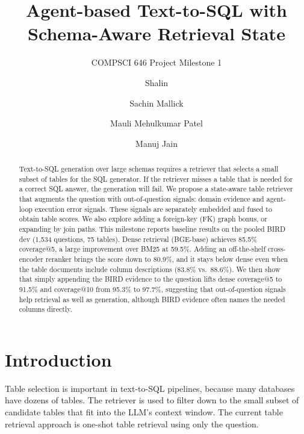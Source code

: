 \documentclass[sigconf,nonacm]{acmart}
\begin{document}
\title{Agent-based Text-to-SQL with Schema-Aware Retrieval State}
\subtitle{COMPSCI 646 Project Milestone 1}

\author{Shalin}
\author{Sachin Mallick}
\author{Mauli Mehulkumar Patel}
\author{Manuj Jain}
\renewcommand{\shortauthors}{Shalin, Mallick, Patel, Jain}

\begin{abstract}
Text-to-SQL generation over large schemas requires a retriever that selects a small subset of tables for the SQL generator. If the retriever misses a table that is needed for a correct SQL answer, the generation will fail. We propose a state-aware table retriever that augments the question with out-of-question signals: domain evidence and agent-loop execution error signals. These signals are separately embedded and fused to obtain table scores. We also explore adding a foreign-key (FK) graph bonus, or expanding by join paths. This milestone reports baseline results on the pooled BIRD dev (1,534 questions, 75 tables). Dense retrieval (BGE-base) achieves 85.5\% coverage@5, a large improvement over BM25 at 59.5\%. Adding an off-the-shelf cross-encoder reranker brings the score down to 80.9\%, and it stays below dense even when the table documents include column descriptions (83.8\% vs.\ 88.6\%). We then show that simply appending the BIRD evidence to the question lifts dense coverage@5 to 91.5\% and coverage@10 from 95.3\% to 97.7\%, suggesting that out-of-question signals help retrieval as well as generation, although BIRD evidence often names the needed columns directly.

\end{abstract}

\maketitle

\section{Introduction}

Table selection is important in text-to-SQL pipelines, because many databases have dozens of tables. The retriever is used to filter down to the small subset of candidate tables that fit into the LLM's context window. The current table retrieval approach is one-shot table retrieval using only the question.
\end{document}
